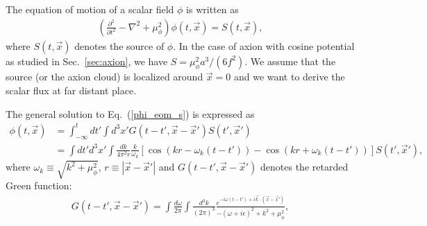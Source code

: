 \documentclass[%
 preprint,
 nofootinbib,
 amsmath,amssymb,
 aps,
 a4paper
]{revtex4-1}
\begin{document}
The equation of motion of a scalar field $\phi$ is written as
\begin{align}
	\left(\frac{\partial^2}{\partial t^2} -\nabla^2 + \mu_\phi^2\right)\phi(t,\vec x) = S(t,\vec x),   \label{phi_eom_s}
\end{align}
where $S(t,\vec x)$ denotes the source of $\phi$. In the case of axion with cosine potential as studied in Sec.~\ref{sec:axion}, we have $S = \mu_\phi^2 a^3/(6f^2)$. We assume that the source (or the axion cloud) is localized around $\vec x=0$ and we want to derive the scalar flux at far distant place.

The general solution to Eq.~(\ref{phi_eom_s}) is expressed as
\begin{align}
	\phi(t,\vec x) &= \int_{-\infty}^{t} dt' \int d^3x' G(t-t',\vec x-\vec x') S(t',\vec x') \\
	&=\int dt'd^3x' \int \frac{dk}{4\pi^2 r} \frac{k}{\omega_k}\left[\cos(kr-\omega_k(t-t'))-\cos(kr+\omega_k(t-t')) \right] S(t',\vec x'),
	\label{phitx}
\end{align}
where $\omega_k \equiv \sqrt{k^2+\mu_\phi^2}$, $r\equiv |\vec x-\vec x'|$ and $G(t-t',\vec x-\vec x')$ denotes the retarded Green function:
\begin{align}
	G(t-t', \vec x-\vec x') = \int \frac{d\omega}{2\pi} \int\frac{d^3k}{(2\pi)^3}\frac{e^{-i\omega (t-t')+ i\vec k\cdot(\vec x-\vec x')}}{-(\omega+i\epsilon)^2+k^2+\mu_\phi^2},
\end{align}
\end{document}
